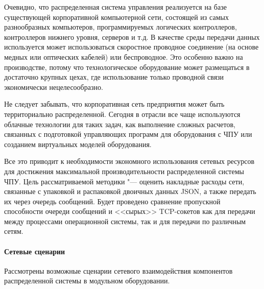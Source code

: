 Очевидно, что распределенная система управления реализуется на базе существующей корпоративной компьютерной сети, состоящей из самых разнообразных компьютеров, программируемых логических контроллеров, контроллеров нижнего уровня, серверов и т.д. В качестве среды передачи данных используется может использоваться скоростное проводное соединение (на основе медных или оптических кабелей) или беспроводное. Это особенно важно на производстве, потому что технологическое оборудование может размещаться в достаточно крупных цехах, где использование только проводной связи экономически нецелесообразно.

Не следует забывать, что корпоративная сеть предприятия может быть территориально распределенной. Сегодня в отрасли все чаще используются облачные технологии для таких задач, как выполнение сложных расчетов, связанных с подготовкой управляющих программ для оборудования с ЧПУ или созданием виртуальных моделей оборудования.

Все это приводит к необходимости экономного использования сетевых ресурсов для достижения максимальной производительности распределенной системы ЧПУ. Цель рассматриваемой методики "--- оценить накладные расходы сети, связанные с упаковкой и распаковкой двоичных данных JSON, а также передать их через очередь сообщений. Будет проведено сравнение пропускной способности очереди сообщений и <<сырых>> TCP-сокетов как для передачи между процессами операционной системы, так и для передачи по различным сетям.

\paragraph{Сетевые сценарии}

Рассмотрены возможные сценарии сетевого взаимодействия компонентов распределенной системы в модульном оборудовании.

